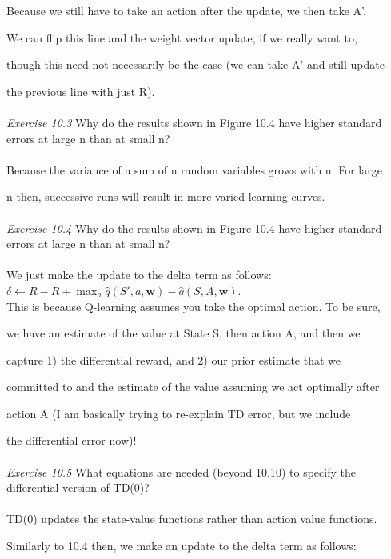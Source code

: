 \documentclass{article}
\begin{document}
Because we still have to take an action after the update, we then take A'. 

We can flip this line and the weight vector update, if we really want to, 

though this need not necessarily be the case (we can take A' and still update 

the previous line with just R).
\\\\
\textit{Exercise 10.3} Why do the results shown in Figure 10.4 have higher standard errors at
large n than at small n?
\\
\\

Because the variance of a sum of n random variables grows with n. For large 

n then, successive runs will result in more varied learning curves.
\\\\
\textit{Exercise 10.4} Why do the results shown in Figure 10.4 have higher standard errors at
large n than at small n?
\\
\\

We just make the update to the delta term as follows: 
\\

$\delta \leftarrow R - \bar{R} + \max_{a} \hat{q}(S', a, \mathbf{w}) - \hat{q}(S, A, \mathbf{w})$.
\\

This is because Q-learning assumes you take the optimal action. To be sure,

we have an estimate of the value at State S, then action A, and then we 

capture 1) the differential reward, and 2) our prior estimate that we 

committed to and the estimate of the value assuming we act optimally after 

action A (I am basically trying to re-explain TD error, but we include 

the differential error now)!
\\\\
\textit{Exercise 10.5} What equations are needed (beyond 10.10) to specify the differential
version of TD(0)?
\\
\\

TD(0) updates the state-value functions rather than action value functions.

Similarly to 10.4 then, we make an update to the delta term as follows:
\\
\end{document}
